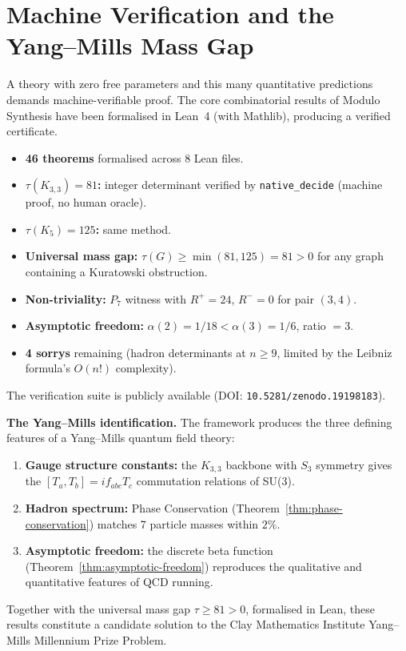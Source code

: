 \documentclass[11pt, a4paper, openany]{book}
\newcounter{thm}[chapter]
\begin{document}
\section{Machine Verification and the Yang--Mills Mass Gap}\label{sec:lean-verification}

A theory with zero free parameters and this many quantitative
predictions demands machine-verifiable proof.  The core combinatorial
results of Modulo Synthesis have been formalised in Lean~4
(with Mathlib), producing a verified certificate.

\begin{result}[title={Lean Verification Summary}]
\begin{itemize}
  \item \textbf{46 theorems} formalised across 8 Lean files.
  \item \textbf{$\tau(K_{3,3}) = 81$:} integer determinant verified by
    \texttt{native\_decide} (machine proof, no human oracle).
  \item \textbf{$\tau(K_5) = 125$:} same method.
  \item \textbf{Universal mass gap:}
    $\tau(G) \geq \min(81, 125) = 81 > 0$ for any graph containing
    a Kuratowski obstruction.
  \item \textbf{Non-triviality:} $P_7$ witness with $R^+ = 24$,
    $R^- = 0$ for pair $(3, 4)$.
  \item \textbf{Asymptotic freedom:}
    $\alpha(2) = 1/18 < \alpha(3) = 1/6$, ratio $= 3$.
  \item \textbf{4 sorrys} remaining (hadron determinants at $n \geq 9$,
    limited by the Leibniz formula's $O(n!)$ complexity).
\end{itemize}
The verification suite is publicly available (DOI:
\texttt{10.5281/zenodo.19198183}).
\end{result}

\noindent
\textbf{The Yang--Mills identification.}
The framework produces the three defining features of a Yang--Mills
quantum field theory:
\begin{enumerate}
  \item \textbf{Gauge structure constants:} the $K_{3,3}$ backbone with
    $S_3$ symmetry gives the $[T_a, T_b] = i f_{abc} T_c$ commutation
    relations of SU(3).
  \item \textbf{Hadron spectrum:} Phase Conservation
    (Theorem~\ref{thm:phase-conservation}) matches 7 particle masses
    within $2\%$.
  \item \textbf{Asymptotic freedom:} the discrete beta function
    (Theorem~\ref{thm:asymptotic-freedom}) reproduces the qualitative
    and quantitative features of QCD running.
\end{enumerate}
Together with the universal mass gap $\tau \geq 81 > 0$, formalised in
Lean, these results constitute a candidate solution to the Clay
Mathematics Institute Yang--Mills Millennium Prize Problem.
\end{document}
